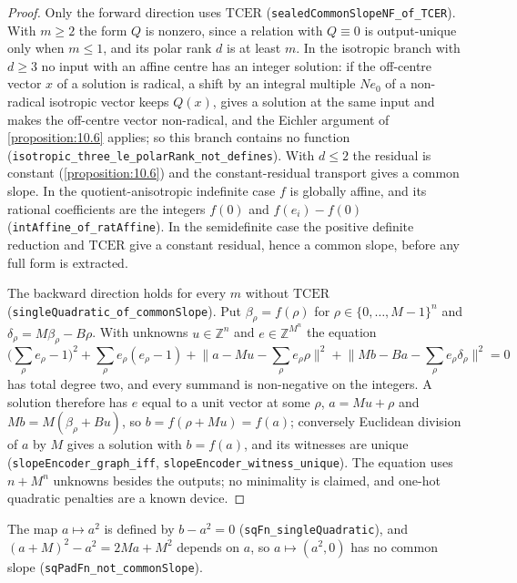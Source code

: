 \begin{proof}
Only the forward direction uses $\mathrm{TCER}$ (\texttt{sealedCommonSlopeNF\_of\_TCER}). With $m ≥ 2$ the form $Q$ is nonzero, since a relation with $Q ≡ 0$ is output-unique only when $m ≤ 1$, and its polar rank $d$ is at least $m$. In the isotropic branch with $d ≥ 3$ no input with an affine centre has an integer solution: if the off-centre vector $x$ of a solution is radical, a shift by an integral multiple $Ne_{0}$ of a non-radical isotropic vector keeps $Q(x)$, gives a solution at the same input and makes the off-centre vector non-radical, and the Eichler argument of \cref{proposition:10.6} applies; so this branch contains no function (\texttt{isotropic\_three\_le\_polarRank\_not\_defines}). With $d ≤ 2$ the residual is constant (\cref{proposition:10.6}) and the constant-residual transport gives a common slope. In the quotient-anisotropic indefinite case $f$ is globally affine, and its rational coefficients are the integers $f(0)$ and $f(e_{i}) - f(0)$ (\texttt{intAffine\_of\_ratAffine}). In the semidefinite case the positive definite reduction and $\mathrm{TCER}$ give a constant residual, hence a common slope, before any full form is extracted.

The backward direction holds for every $m$ without $\mathrm{TCER}$ (\texttt{singleQuadratic\_of\_commonSlope}). Put $β_{ρ} = f(ρ)$ for $ρ ∈ \{0, \dots, M - 1\}^{n}$ and $δ_{ρ} = Mβ_{ρ} - Bρ$. With unknowns $u ∈ ℤ^{n}$ and $e ∈ ℤ^{M^{n}}$ the equation
\[
\Big(\sum_{ρ} e_{ρ} - 1\Big)^{2} + \sum_{ρ} e_{ρ}(e_{ρ} - 1) + \Big\lVert a - Mu - \sum_{ρ} e_{ρ}ρ\Big\rVert^{2} + \Big\lVert Mb - Ba - \sum_{ρ} e_{ρ}δ_{ρ}\Big\rVert^{2} = 0
\]
has total degree two, and every summand is non-negative on the integers. A solution therefore has $e$ equal to a unit vector at some $ρ$, $a = Mu + ρ$ and $Mb = M(β_{ρ} + Bu)$, so $b = f(ρ + Mu) = f(a)$; conversely Euclidean division of $a$ by $M$ gives a solution with $b = f(a)$, and its witnesses are unique (\texttt{slopeEncoder\_graph\_iff}, \texttt{slopeEncoder\_witness\_unique}). The equation uses $n + M^{n}$ unknowns besides the outputs; no minimality is claimed, and one-hot quadratic penalties are a known device.
\end{proof}

The map $a ↦ a^{2}$ is defined by $b - a^{2} = 0$ (\texttt{sqFn\_singleQuadratic}), and $(a + M)^{2} - a^{2} = 2Ma + M^{2}$ depends on $a$, so $a ↦ (a^{2}, 0)$ has no common slope (\texttt{sqPadFn\_not\_commonSlope}).


